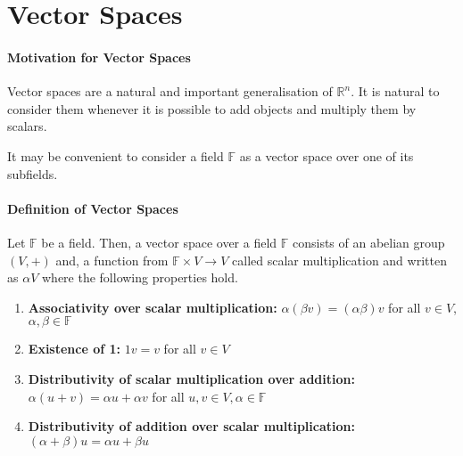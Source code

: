 \section{Vector Spaces}

\paragraph{Motivation for Vector Spaces}
Vector spaces are a natural and important generalisation of 
\(\mathbb{R}^n\). It is natural to consider them whenever
it is possible to add objects and multiply them by scalars.

It may be convenient to consider a field \(\mathbb{F}\) as a vector
space over one of its subfields.

\paragraph{Definition of Vector Spaces}
Let \(\mathbb{F}\) be a field.
Then, a vector space over a field \(\mathbb{F}\) consists of an abelian
group \((V, +)\) and, a function from \(\mathbb{F}\times V \to V\) called
scalar multiplication and written as \(\alpha V\) where the following
properties hold.
\begin{enumerate}
    \item \textbf{Associativity over scalar multiplication:}
    \(\alpha (\beta v) = (\alpha\beta)v\)
    for all \(v\in V\), \(\alpha, \beta \in \mathbb{F}\)
    \item \textbf{Existence of 1:} \(1v = v\) for all \(v\in V\)
    \item \textbf{Distributivity of scalar multiplication over addition:}
    \(\alpha(u + v) = \alpha u + \alpha v\)
    for all \(u, v \in V, \alpha \in \mathbb{F}\)
    \item \textbf{Distributivity of addition over scalar multiplication:}
    \((\alpha+\beta)u = \alpha u + \beta u\)
\end{enumerate}



